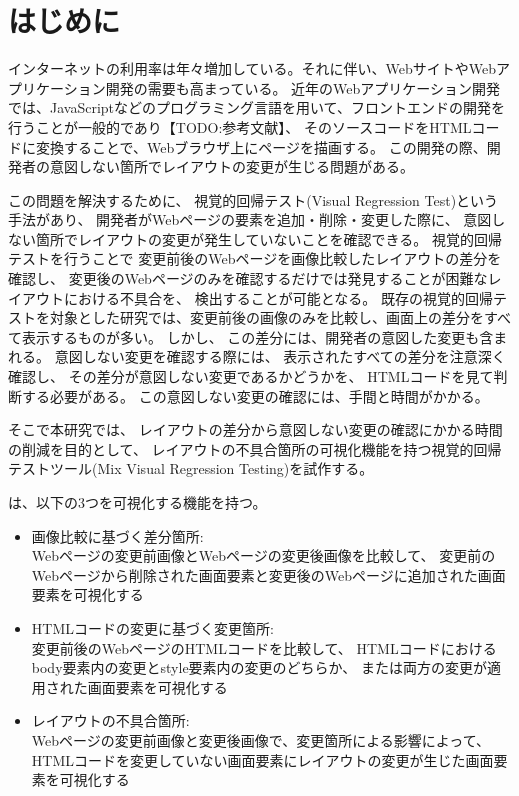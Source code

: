 \chapter{はじめに}\label{cha:Introduction}
インターネットの利用率は年々増加している\cite{Soumusyou}。それに伴い、WebサイトやWebアプリケーション開発の需要も高まっている。
近年のWebアプリケーション開発では、JavaScriptなどのプログラミング言語を用いて、フロントエンドの開発を行うことが一般的であり【TODO:参考文献】、
そのソースコードをHTMLコードに変換することで、Webブラウザ上にページを描画する。
この開発の際、開発者の意図しない箇所でレイアウトの変更が生じる問題がある。
\par
この問題を解決するために、
視覚的回帰テスト(Visual Regression Test)\cite{VisualRegressionTesting}という手法があり、
開発者がWebページの要素を追加・削除・変更した際に、
意図しない箇所でレイアウトの変更が発生していないことを確認できる。
視覚的回帰テストを行うことで
変更前後のWebページを画像比較したレイアウトの差分を確認し、
変更後のWebページのみを確認するだけでは発見することが困難なレイアウトにおける不具合を、
検出することが可能となる。
既存の視覚的回帰テストを対象とした研究では、変更前後の画像のみを比較し、画面上の差分をすべて表示するものが多い。
しかし、
この差分には、開発者の意図した変更も含まれる。
意図しない変更を確認する際には、
表示されたすべての差分を注意深く確認し、
その差分が意図しない変更であるかどうかを、
HTMLコードを見て判断する必要がある。
この意図しない変更の確認には、手間と時間がかかる。
\par
そこで本研究では、
レイアウトの差分から意図しない変更の確認にかかる時間の削減を目的として、
レイアウトの不具合箇所の可視化機能を持つ視覚的回帰テストツール\toolName(Mix Visual Regression Testing)を試作する。
\par
\toolName は、以下の3つを可視化する機能を持つ。
\begin{itemize}
      \item 画像比較に基づく差分箇所:\\
            Webページの変更前画像とWebページの変更後画像を比較して、
            変更前のWebページから削除された画面要素と変更後のWebページに追加された画面要素を可視化する
      \item HTMLコードの変更に基づく変更箇所:\\
            変更前後のWebページのHTMLコードを比較して、
            HTMLコードにおけるbody要素内の変更とstyle要素内の変更のどちらか、
            または両方の変更が適用された画面要素を可視化する
      \item レイアウトの不具合箇所:\\
            Webページの変更前画像と変更後画像で、変更箇所による影響によって、
            HTMLコードを変更していない画面要素にレイアウトの変更が生じた画面要素を可視化する
\end{itemize}

